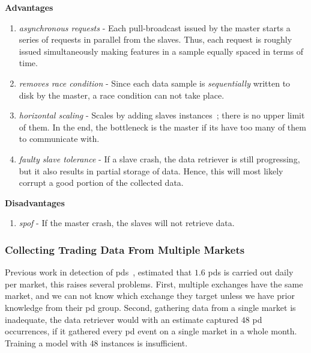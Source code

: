 \textbf{Advantages}
\begin{enumerate}
    \item \emph{asynchronous requests} - Each pull-broadcast issued by the master starts a series of requests in parallel from the slaves. Thus, each request is roughly issued simultaneously making features in a sample equally spaced in terms of time.
    
    \item \emph{removes race condition} - Since each data sample is \emph{sequentially} written to disk by the master, a race condition can not take place. 
    
    \item \emph{horizontal scaling} - Scales by adding slaves instances~\cite{ms_hor}; there is no upper limit of them. In the end, the bottleneck is the master if its have too many of them to communicate with.
    
    \item \emph{faulty slave tolerance} - If a slave crash, the data retriever is still progressing, but it also results in partial storage of data. Hence, this will most likely corrupt a good portion of the collected data.
\end{enumerate}

\textbf{Disadvantages}
\begin{enumerate}
    \item \emph{\ac{spof}} - If the master crash, the slaves will not retrieve data.
\end{enumerate}

\subsubsection{Collecting Trading Data From Multiple Markets}
Previous work in detection of \acp{pd}~\cite{P&D_to_the_moon}, estimated that $1.6$ \acp{pd} is carried out daily per market, this raises several problems. First, multiple exchanges have the same market, and we can not know which exchange they target unless we have prior knowledge from their \ac{pd} group. Second, gathering data from a single market is inadequate, the data retriever would with an estimate captured $48$ \ac{pd} occurrences, if it gathered every \ac{pd} event on a single market in a whole month. Training a model with $48$ instances is insufficient. 

